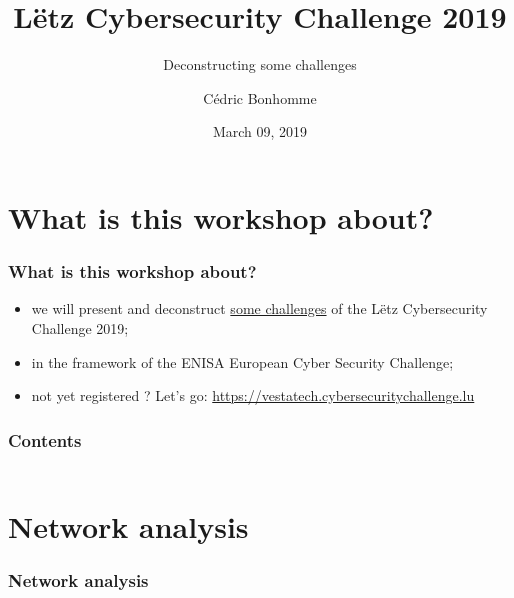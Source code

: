 \documentclass[]{beamer}
\title[Deconstructing some challenges from LCSC 2019]{Lëtz Cybersecurity Challenge 2019}
\subtitle{Deconstructing some challenges}
\author{C\'{e}dric Bonhomme}
\institute[SMILE]{Security Made In Lëtzebuerg}
\date{March 09, 2019}
\begin{document}
\begin{frame}
    \titlepage
\end{frame}


%
%
\section*{What is this workshop about?}
\begin{frame}
    \frametitle{What is this workshop about?}
    \begin{center}
        \begin{itemize}
            \item we will present and deconstruct \href{https://github.com/cscluxembourg/vestatech}{some challenges} of the Lëtz Cybersecurity Challenge 2019;
            \item in the framework of the ENISA European Cyber Security Challenge;
            \item not yet registered ? Let's go: \href{https://vestatech.cybersecuritychallenge.lu}{https://vestatech.cybersecuritychallenge.lu}
        \end{itemize}
    \end{center}
\end{frame}


\begin{frame}
    \frametitle{Contents}
    \begin{columns}[t]
        \begin{column}{5cm}
            \tableofcontents[sections={1-3}]
        \end{column}
        \begin{column}{5cm}
            \tableofcontents[sections={4-5}]
        \end{column}
    \end{columns}
\end{frame}



%
%
\section{Network analysis}
\begin{frame}
    \frametitle{Network analysis}
    \begin{columns}[t]
        \begin{column}{5cm}
            \tableofcontents[sections={1-3}, currentsection, hideothersubsections]
        \end{column}
        \begin{column}{5cm}
            \tableofcontents[sections={4-5}, currentsection, hideothersubsections]
        \end{column}
    \end{columns}
\end{frame}
\end{document}
